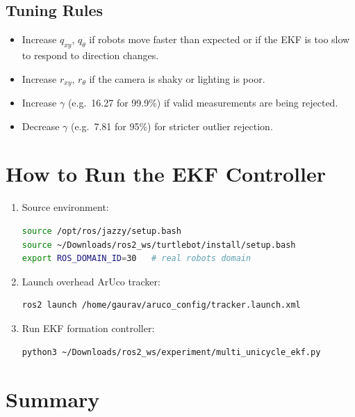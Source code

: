 \documentclass[12pt,a4paper]{article}
\begin{document}
\subsection*{Tuning Rules}
\begin{itemize}
  \item Increase $q_{xy}$, $q_\theta$ if robots move faster than expected or
        if the EKF is too slow to respond to direction changes.
  \item Increase $r_{xy}$, $r_\theta$ if the camera is shaky or lighting is poor.
  \item Increase $\gamma$ (e.g.\ 16.27 for 99.9\%) if valid measurements
        are being rejected.
  \item Decrease $\gamma$ (e.g.\ 7.81 for 95\%) for stricter outlier rejection.
\end{itemize}

\section{How to Run the EKF Controller}
\label{sec:run}

\begin{enumerate}
\item Source environment:
\begin{lstlisting}[language=bash]
source /opt/ros/jazzy/setup.bash
source ~/Downloads/ros2_ws/turtlebot/install/setup.bash
export ROS_DOMAIN_ID=30   # real robots domain
\end{lstlisting}

\item Launch overhead ArUco tracker:
\begin{lstlisting}[language=bash]
ros2 launch /home/gaurav/aruco_config/tracker.launch.xml
\end{lstlisting}

\item Run EKF formation controller:
\begin{lstlisting}[language=bash]
python3 ~/Downloads/ros2_ws/experiment/multi_unicycle_ekf.py
\end{lstlisting}
\end{enumerate}

\section{Summary}
\label{sec:summary}
\end{document}
